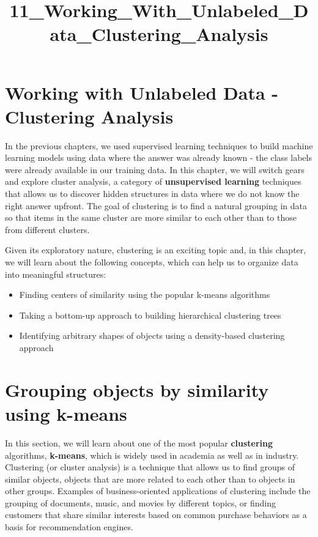\documentclass[11pt]{article}
\title{11\_Working\_With\_Unlabeled\_Data\_Clustering\_Analysis}
\providecommand{\tightlist}{%
      \setlength{\itemsep}{0pt}\setlength{\parskip}{0pt}}
\begin{document}
    
    
    \maketitle
    
    

    
    \section{Working with Unlabeled Data - Clustering
Analysis}\label{working-with-unlabeled-data---clustering-analysis}

    In the previous chapters, we used supervised learning techniques to
build machine learning models using data where the answer was already
known - the class labels were already available in our training data. In
this chapter, we will switch gears and explore cluster analysis, a
category of \textbf{unsupervised learning} techniques that allows us to
discover hidden structures in data where we do not know the right answer
upfront. The goal of clustering is to find a natural grouping in data so
that items in the same cluster are more similar to each other than to
those from different clusters.

Given its exploratory nature, clustering is an exciting topic and, in
this chapter, we will learn about the following concepts, which can help
us to organize data into meaningful structures:

\begin{itemize}
\tightlist
\item
  Finding centers of similarity using the popular k-means algorithms
\item
  Taking a bottom-up approach to building hierarchical clustering trees
\item
  Identifying arbitrary shapes of objects using a density-based
  clustering approach
\end{itemize}

    \section{Grouping objects by similarity using
k-means}\label{grouping-objects-by-similarity-using-k-means}

    In this section, we will learn about one of the most popular
\textbf{clustering} algorithms, \textbf{k-means}, which is widely used
in academia as well as in industry. Clustering (or cluster analysis) is
a technique that allows us to find groups of similar objects, objects
that are more related to each other than to objects in other groups.
Examples of business-oriented applications of clustering include the
grouping of documents, music, and movies by different topics, or finding
customers that share similar interests based on common purchase
behaviors as a basis for recommendation engines.
\end{document}

